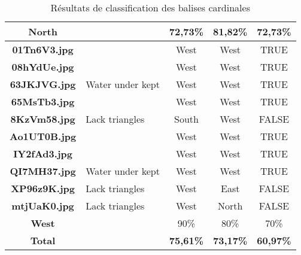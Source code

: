 \documentclass{article}
\begin{document}
\begin{table}[h!]
{\begin{tabular}{|c|p{4cm}|c|c|c|}
            \rowcolor{gray!40}
            \textbf{North}       &                              & 72,73\%                       & 81,82\%                          & 72,73\%              \\ \hline
            \rowcolor{gray!0}
            \textbf{01Tn6V3.jpg} &                              & West                          & West                             & TRUE                 \\ \hline
            \rowcolor{gray!10}
            \textbf{08hYdUe.jpg} &                              & West                          & West                             & TRUE                 \\ \hline
            \rowcolor{gray!0}
            \textbf{63JKJVG.jpg} & Water under kept             & West                          & West                             & TRUE                 \\ \hline
            \rowcolor{gray!10}
            \textbf{65MsTb3.jpg} &                              & West                          & West                             & TRUE                 \\ \hline
            \rowcolor{gray!0}
            \textbf{8KzVm58.jpg} & Lack triangles               & South                         & West                             & FALSE                \\ \hline
            \rowcolor{gray!10}
            \textbf{Ao1UT0B.jpg} &                              & West                          & West                             & TRUE                 \\ \hline
            \rowcolor{gray!0}
            \textbf{IY2fAd3.jpg} &                              & West                          & West                             & TRUE                 \\ \hline
            \rowcolor{gray!10}
            \textbf{QI7MH37.jpg} & Water under kept             & West                          & West                             & TRUE                 \\ \hline
            \rowcolor{gray!0}
            \textbf{XP96z9K.jpg} & Lack triangles               & West                          & East                             & FALSE                \\ \hline
            \rowcolor{gray!10}
            \textbf{mtjUaK0.jpg} & Lack triangles               & West                          & North                            & FALSE                \\ \hline
            \rowcolor{gray!40}
            \textbf{West}        &                              & 90\%                          & 80\%                             & 70\%                 \\ \hline
            \rowcolor{gray!40}
            \textbf{Total}       &                              & \textbf{75,61\%}              & \textbf{73,17\%}                 & \textbf{60,97\%}     \\ \hline
        \end{tabular}%
    }
    \caption{Résultats de classification des balises cardinales}\label{tab:segmentation_results}
\end{table}
\end{document}
